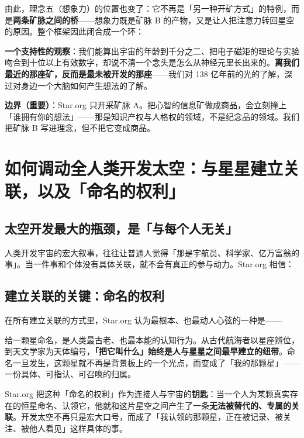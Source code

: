 \documentclass[11pt,fontset=none]{ctexart}
\begin{document}
由此，理念五（想象力）的位置也变了：它不再是「另一种开矿方式」的特例，而是\textbf{两条矿脉之间的桥}——想象力既是矿脉 B 的产物，又是让人把注意力转回星空的原因。整个框架因此闭合成一个环：


\textbf{一个支持性的观察}：我们能算出宇宙的年龄到千分之二、把电子磁矩的理论与实验吻合到十位以上有效数字，却说不清一个念头是怎么从神经元里长出来的。\textbf{离我们最近的那座矿，反而是最未被开发的那座}——我们对 138 亿年前的光的了解，深过对身边一个大脑如何产生想法的了解。

\textbf{边界（重要）}：Star.org 只开采矿脉 A。把心智的信息矿做成商品，会立刻撞上「谁拥有你的想法」——那是知识产权与人格权的领域，不是纪念品的领域。我们把矿脉 B 写进理念，但不把它变成商品。


\section{如何调动全人类开发太空：与星星建立关联，以及「命名的权利」}

\subsection{太空开发最大的瓶颈，是「与每个人无关」}

人类开发宇宙的宏大叙事，往往让普通人觉得「那是宇航员、科学家、亿万富翁的事」。当一件事和个体没有具体关联，就不会有真正的参与动力。Star.org 相信：


\subsection{建立关联的关键：命名的权利}

在所有建立关联的方式里，Star.org 认为最根本、也最动人心弦的一种是——


给一颗星命名，是人类最古老、也最本能的认知行为。从古代航海者以星座辨位，到天文学家为天体编号，\textbf{「把它叫什么」始终是人与星星之间最早建立的纽带}。命名一旦发生，这颗星就不再是背景板上的一个光点，而变成了「我的那颗星」——一份具体、可指认、可召唤的归属。

Star.org 把这种「命名的权利」作为连接人与宇宙的\textbf{钥匙}：当一个人为某颗真实存在的恒星命名、认领它，他就和这片星空之间产生了一条\textbf{无法被替代的、专属的关联}。开发太空不再只是宏大口号，而成了「我认领的那颗星，正在被记录、被关注、被他人看见」这样具体的事。
\end{document}
